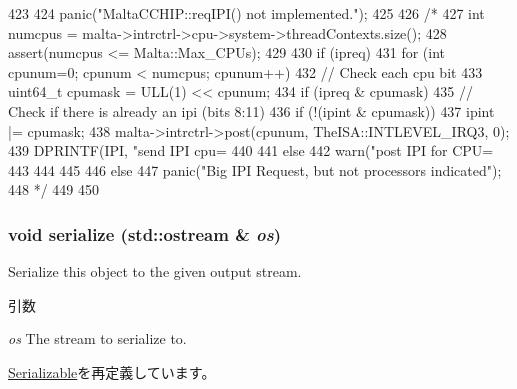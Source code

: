 \begin{DoxyCode}
423 {
424                 panic("MaltaCCHIP::reqIPI() not implemented.");
425 
426                 /*
427     int numcpus = malta->intrctrl->cpu->system->threadContexts.size();
428     assert(numcpus <= Malta::Max_CPUs);
429 
430     if (ipreq) {
431         for (int cpunum=0; cpunum < numcpus; cpunum++) {
432             // Check each cpu bit
433             uint64_t cpumask = ULL(1) << cpunum;
434             if (ipreq & cpumask) {
435                 // Check if there is already an ipi (bits 8:11)
436                 if (!(ipint & cpumask)) {
437                     ipint  |= cpumask;
438                     malta->intrctrl->post(cpunum, TheISA::INTLEVEL_IRQ3, 0);
439                     DPRINTF(IPI, "send IPI cpu=%
440                 }
441                 else
442                     warn("post IPI for CPU=%
443             }
444         }
445     }
446     else
447         panic("Big IPI Request, but not processors indicated\n");
448    */
449 
450 }
\end{DoxyCode}
\hypertarget{classMaltaCChip_a53e036786d17361be4c7320d39c99b84}{
\subsubsection[{serialize}]{\setlength{\rightskip}{0pt plus 5cm}void serialize (std::ostream \& {\em os})}}
\label{classMaltaCChip_a53e036786d17361be4c7320d39c99b84}
Serialize this object to the given output stream. 
\begin{DoxyParams}{引数}
\item[{\em os}]The stream to serialize to. \end{DoxyParams}


\hyperlink{classSerializable_ad6272f80ae37e8331e3969b3f072a801}{Serializable}を再定義しています。


